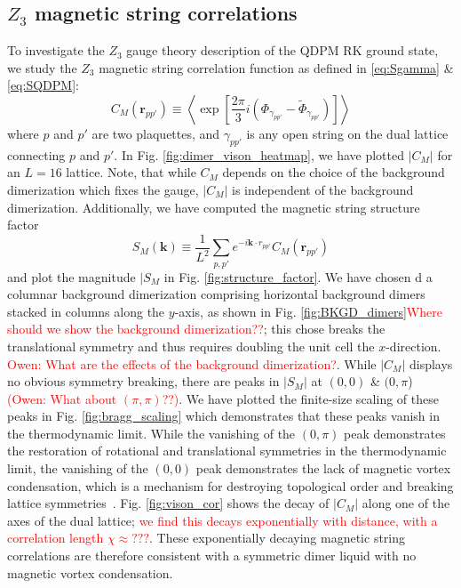 \documentclass[twocolumn,prb,aps,floatfix,superscriptaddress]{revtex4-1}
\newcommand{\figref}[1]{Fig. \ref{#1}}
\newcommand{\note}[1]{\textcolor{red}{#1}}
\begin{document}
\subsection{$Z_3$ magnetic string correlations}

To investigate the $Z_3$ gauge theory description of the QDPM RK ground state, we study the $Z_3$ magnetic string correlation function as defined in \eqref{eq:Sgamma} \& \eqref{eq:SQDPM}:
\begin{equation}
C_M \left( \bm{r}_{pp'} \right) \equiv \left \langle \exp \left[ \frac{2 \pi}{3} i \left( \Phi_{\gamma_{pp'}} -\tilde{\Phi}_{\gamma_{pp'}} \right) \right] \right \rangle
\end{equation}
where $p$ and $p'$ are two plaquettes, and $\gamma_{pp'}$ is any open string on the dual lattice connecting $p$ and $p'$. In \figref{fig:dimer_vison_heatmap}, we have plotted $|C_M|$ for an $L=16$ lattice. Note, that while $C_M$ depends on the choice of the background dimerization which fixes the gauge, $|C_M|$ is independent of the background dimerization. Additionally, we have computed the magnetic string structure factor
\begin{equation}
S_M\left( \bm{k} \right) \equiv \frac{1}{ L^2} \sum_{p,p'} e^{-i \bm{k} \cdot r_{pp'}} C_M\left( \bm{r}_{pp'}\right)
\end{equation}
and plot the magnitude $|S_M$ in \figref{fig:structure_factor}. We have chosen d a columnar background dimerization comprising horizontal background dimers stacked in columns along the $y$-axis, as shown in \figref{fig:BKGD_dimers}\note{Where should we show the background dimerization??}; this chose breaks the translational symmetry and thus requires doubling the unit cell the $x$-direction. \note{Owen: What are the effects of the background dimerization?}. While $|C_M|$ displays no obvious symmetry breaking, there are peaks in $|S_M|$ at $(0,0)$ \& $(0,\pi$) \note{(Owen: What about $(\pi,\pi)$??)}. We have plotted the finite-size scaling of these peaks in \figref{fig:bragg_scaling} which demonstrates that these peaks vanish in the thermodynamic limit. While the vanishing of the $(0,\pi)$ peak demonstrates the restoration of rotational and translational symmetries in the thermodynamic limit, the vanishing of the $(0,0)$ peak demonstrates the lack of magnetic vortex condensation, which is a mechanism for destroying topological order and breaking lattice symmetries~\cite{Jalabert1991,Ralko2007,Huh2011}. \figref{fig:vison_cor} shows the decay of $|C_M|$ along one of the axes of the dual lattice; \note{we find this decays exponentially with distance, with a correlation length $\chi\approx???$}. These exponentially decaying magnetic string correlations are therefore consistent with a symmetric dimer liquid with no magnetic vortex condensation.
\end{document}
